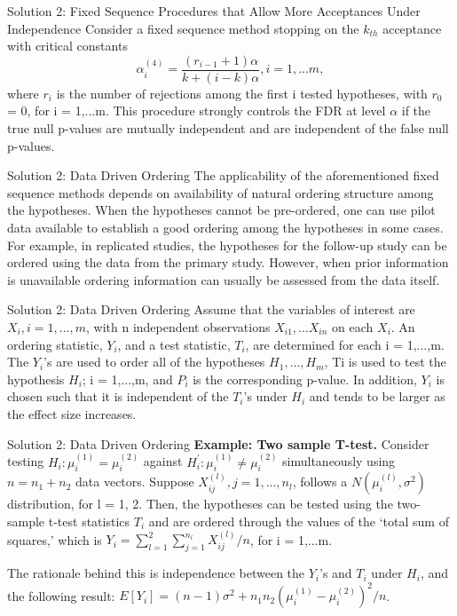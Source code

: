 \documentclass{beamer}
\begin{document}
\begin{frame}[t]{Solution 2: Fixed Sequence Procedures that Allow More Acceptances Under Independence}\vspace{10pt}
Consider a fixed sequence method stopping on the $k_{th}$ acceptance with critical constants
$$ \alpha_i^{(4)} = \frac{(r_{i-1}+1)\alpha}{k+(i-k)\alpha} , i = 1,...m, $$ where $r_i$ is the number of rejections among the first i tested hypotheses, with $r_0$ = 0, for i = 1,...m. 
This procedure strongly controls the FDR at level $\alpha$ if the true null p-values are mutually independent and are independent of the false null p-values.
\end{frame}

\begin{frame}[t]{Solution 2: Data Driven Ordering}\vspace{10pt}
The applicability of the aforementioned fixed sequence methods depends on availability of natural ordering structure among the hypotheses. When the hypotheses cannot be pre-ordered, one can use pilot data available to establish a good ordering among the hypotheses in some cases. For example, in replicated studies, the hypotheses for the follow-up study can be ordered using the data from the primary study. However, when prior information is unavailable ordering information can usually be assessed from the data itself. 
\end{frame}

\begin{frame}[t]{Solution 2: Data Driven Ordering}\vspace{10pt}
Assume that the variables of interest are $X_i, i = 1,...,m$, with n independent observations $X_{i1},...X_{in}$ on each $X_i$. An ordering statistic, $Y_i$, and a test statistic, $T_i$, are determined for each i = 1,...,m. The $Y_i$'s are used to order all of the hypotheses $H_1,...,H_m$, Ti is used to test the hypothesis $H_i$; i = 1,...,m, and $P_i$ is the corresponding p-value. In addition, $Y_i$ is chosen such that it is independent of the $T_i$'s under $H_i$ and tends to be larger as the effect size increases. 
\end{frame}

\begin{frame}[t]{Solution 2: Data Driven Ordering}\vspace{10pt}
\textbf{Example: Two sample T-test.} Consider testing $H_i : \mu_i^{(1)} = \mu_i^{(2)}$ against $H^{'}_i : \mu_i^{(1)} \neq \mu_i^{(2)}$ simultaneously using $n = n_1 + n_2$ data vectors. Suppose $X_{ij}^{(l)}, j =1,...,n_l$, follows a $N(\mu_i^{(l)}, \sigma^2)$ distribution, for l = 1, 2. Then, the hypotheses can be tested using the two-sample t-test statistics $T_i$ and are ordered through the values of the ‘total sum of squares,’ which is $Y_i = \sum_{l=1}^{2} \sum_{j=1}^{n_l} X_{ij}^{(l)}/n$, for i = 1,...m. 

The rationale behind this is independence between the $Y_i$'s and $T_i$ under $H_i$, and the following result: $E[Y_i] = (n-1)\sigma^2 + n_1n_2(\mu_i^{(1)} - \mu_i^{(2)})^2/n$.
\end{frame}
\end{document}
